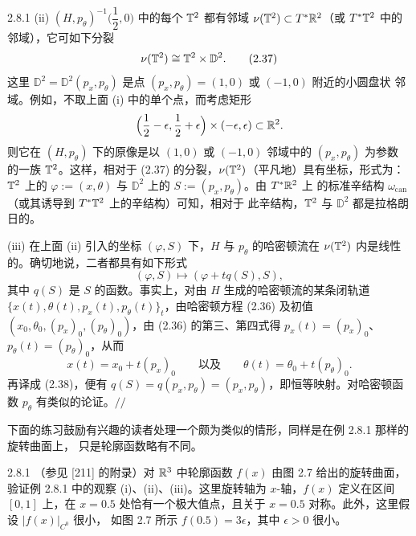 \begin{wexam}{2.8.1}
(ii) $(H,p_\theta)^{-1}\Big(\dfrac12,0\Big)$ 中的每个 $\mathbb{T}^2$ 都有邻域
$\nu(\mathbb{T}^2)\subset T^*\mathbb{R}^2$（或 $T^*\mathbb{T}^2$ 中的邻域），它可如下分裂
\begin{equation}
  \nu(\mathbb{T}^2)\cong\mathbb{T}^2\times\mathbb{D}^2 .
  \tag{2.37}
\end{equation}
这里 $\mathbb{D}^2=\mathbb{D}^2(p_x,p_\theta)$ 是点 $(p_x,p_\theta)=(1,0)$ 或 $(-1,0)$ 附近的小圆盘状
邻域。例如，不取上面 (i) 中的单个点，而考虑矩形
\[
  \Big(\frac12-\epsilon,\frac12+\epsilon\Big)\times(-\epsilon,\epsilon)\subset\mathbb{R}^2 .
\]
则它在 $(H,p_\theta)$ 下的原像是以 $(1,0)$ 或 $(-1,0)$ 邻域中的 $(p_x,p_\theta)$ 为参数
的一族 $\mathbb{T}^2$。这样，相对于 (2.37) 的分裂，$\nu(\mathbb{T}^2)$（平凡地）具有坐标，形式为：
$\mathbb{T}^2$ 上的 $\varphi:=(x,\theta)$ 与 $\mathbb{D}^2$ 上的 $S:=(p_x,p_\theta)$。由 $T^*\mathbb{R}^2$ 上
的标准辛结构 $\omega_{\mathrm{can}}$（或其诱导到 $T^*\mathbb{T}^2$ 上的辛结构）可知，相对于
此辛结构，$\mathbb{T}^2$ 与 $\mathbb{D}^2$ 都是拉格朗日的。

(iii) 在上面 (ii) 引入的坐标 $(\varphi,S)$ 下，$H$ 与 $p_\theta$ 的哈密顿流在
$\nu(\mathbb{T}^2)$ 内是线性的。确切地说，二者都具有如下形式
\begin{equation}
  (\varphi,S)\mapsto(\varphi+tq(S),S),
  \tag{2.38}
\end{equation}
其中 $q(S)$ 是 $S$ 的函数。事实上，对由 $H$ 生成的哈密顿流的某条闭轨道
$\{x(t),\theta(t),p_x(t),p_\theta(t)\}_t$，由哈密顿方程 (2.36) 及初值
$(x_0,\theta_0,(p_x)_0,(p_\theta)_0)$，由 (2.36) 的第三、第四式得
$p_x(t)=(p_x)_0$、$p_\theta(t)=(p_\theta)_0$，从而
\[
  x(t)=x_0+t(p_x)_0\qquad\text{以及}\qquad
  \theta(t)=\theta_0+t(p_\theta)_0 .
\]
再译成 (2.38)，便有 $q(S)=q(p_x,p_\theta)=(p_x,p_\theta)$，即恒等映射。对哈密顿函数
$p_\theta$ 有类似的论证。\hfill$//$
\end{wexam}

下面的练习鼓励有兴趣的读者处理一个颇为类似的情形，同样是在例 2.8.1 那样的旋转曲面上，
只是轮廓函数略有不同。

\begin{wexer}{2.8.1}
（参见 [211] 的附录）对 $\mathbb{R}^3$ 中轮廓函数 $f(x)$ 由图 2.7 给出的旋转曲面，验证例 2.8.1
中的观察 (i)、(ii)、(iii)。这里旋转轴为 $x$-轴，$f(x)$ 定义在区间 $[0,1]$ 上，在
$x=0.5$ 处恰有一个极大值点，且关于 $x=0.5$ 对称。此外，这里假设 $|f(x)|_{C^0}$ 很小，
如图 2.7 所示 $f(0.5)=3\epsilon$，其中 $\epsilon>0$ 很小。
\end{wexer}

